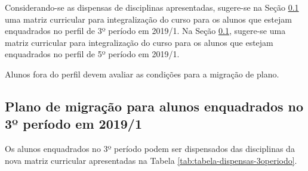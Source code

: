 Considerando-se as dispensas de disciplinas apresentadas, sugere-se na Seção \ref{sec:migracao1} uma matriz curricular para integralização do curso para os alunos que estejam enquadrados no perfil de 3º período em 2019/1. Na Seção \ref{sec:migracao1}, sugere-se uma matriz curricular para integralização do curso para os alunos que estejam enquadrados no perfil de 5º período em 2019/1.

Alunos fora do perfil devem avaliar as condições para a migração de plano.

\subsection{Plano de migração para alunos enquadrados no 3º período em 2019/1}\label{sec:migracao1}

Os alunos enquadrados no 3º período podem ser dispensados das disciplinas da nova matriz curricular apresentadas na Tabela \ref{tab:tabela-dispensas-3operiodo}.

\singlespacing

